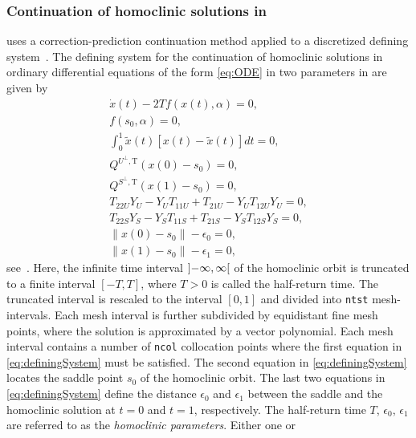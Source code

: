 \subsubsection{Continuation of homoclinic solutions in \MATCONT}
\label{sec:cont_hom_matcont}
\MATCONT uses a correction-prediction continuation method applied to a discretized defining
system~\cite{matcont2}. The defining system for the continuation of homoclinic
solutions in ordinary differential equations of the form \cref{eq:ODE} in two
parameters in \MATCONT are given by
\begin{equation}
\begin{aligned}
    \label{eq:definingSystem}
    \dot{x}(t)-2 T f(x(t), \alpha)=0,  \\
    f\left(s_{0}, \alpha\right)=0, \\
    \int_{0}^{1} \widetilde{x}(t)[x(t)-\widetilde{x}(t)] d t=0, \\
    Q^{U^{\perp}, \mathrm{T}}\left(x(0)-s_{0}\right)=0, \\
    Q^{S^{\perp}, \mathrm{T}}\left(x(1)-s_{0}\right)=0, \\
    T_{22 U} Y_{U}-Y_{U} T_{11 U}+T_{21 U}-Y_{U} T_{12 U} Y_{U}=0, \\
    T_{22 S} Y_{S}-Y_{S} T_{11 S}+T_{21 S}-Y_{S} T_{12 S} Y_{S}=0, \\
    \left\|x(0)-s_{0}\right\|-\epsilon_{0}=0, \\
    \left\|x(1)-s_{0}\right\|-\epsilon_{1}=0,
\end{aligned}
\end{equation}
see~\cite{DeWitte2012}.  Here, the infinite time interval
$\interval[open]{-\infty}{ \infty}$ of the homoclinic orbit is truncated to a
finite interval $[-T,T]$, where $T>0$ is called the half-return time. The
truncated interval is rescaled to the interval $[0,1]$ and divided into
\texttt{ntst} mesh-intervals. Each mesh interval is further
subdivided by equidistant fine mesh points, where the solution is approximated
by a vector polynomial. Each mesh interval contains a number of
\texttt{ncol} collocation points where the first equation in
\cref{eq:definingSystem} must be satisfied. The second equation in
\cref{eq:definingSystem} locates the saddle point $s_0$ of the homoclinic
orbit. The last two equations in \cref{eq:definingSystem} define the distance
$\epsilon_0$ and  $\epsilon_1$ between the saddle and the homoclinic solution
at $t=0$ and $t=1$, respectively. The half-return time $T$, $\epsilon_0$,
$\epsilon_1$ are referred to as the \emph{homoclinic parameters}. Either one or

